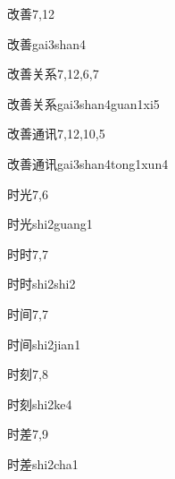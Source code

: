 \begin{entry}{改善}{7,12}
  \begin{phonetics}{改善}{gai3shan4}
  \end{phonetics}
\end{entry}

\begin{entry}{改善关系}{7,12,6,7}
  \begin{phonetics}{改善关系}{gai3shan4guan1xi5}
  \end{phonetics}
\end{entry}

\begin{entry}{改善通讯}{7,12,10,5}
  \begin{phonetics}{改善通讯}{gai3shan4tong1xun4}
  \end{phonetics}
\end{entry}

\begin{entry}{时光}{7,6}
  \begin{phonetics}{时光}{shi2guang1}
  \end{phonetics}
\end{entry}

\begin{entry}{时时}{7,7}
  \begin{phonetics}{时时}{shi2shi2}
  \end{phonetics}
\end{entry}

\begin{entry}{时间}{7,7}
  \begin{phonetics}{时间}{shi2jian1}
  \end{phonetics}
\end{entry}

\begin{entry}{时刻}{7,8}
  \begin{phonetics}{时刻}{shi2ke4}
  \end{phonetics}
\end{entry}

\begin{entry}{时差}{7,9}
  \begin{phonetics}{时差}{shi2cha1}
  \end{phonetics}
\end{entry}

